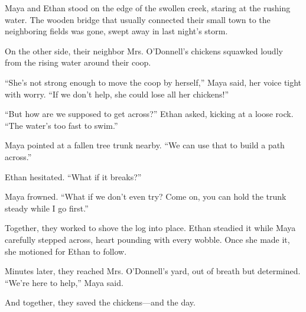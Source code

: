 \documentclass[12pt]{article}
\begin{document}
\begin{tcolorbox}[colframe=black!60, colback=white, 
coltitle=black, colbacktitle=black!15, fonttitle=\bfseries\Large, 
title=Text: The Flooded Creek, halign title=center, left=10pt, right=10pt, top=10pt, bottom=15pt]

Maya and Ethan stood on the edge of the swollen creek, staring at the rushing water. The wooden bridge that usually connected their small town to the neighboring fields was gone, swept away in last night’s storm. 

On the other side, their neighbor Mrs. O’Donnell’s chickens squawked loudly from the rising water around their coop.

“She’s not strong enough to move the coop by herself,” Maya said, her voice tight with worry. “If we don’t help, she could lose all her chickens!”

“But how are we supposed to get across?” Ethan asked, kicking at a loose rock. “The water’s too fast to swim.”

Maya pointed at a fallen tree trunk nearby. “We can use that to build a path across.”

Ethan hesitated. “What if it breaks?”

Maya frowned. “What if we don’t even try? Come on, you can hold the trunk steady while I go first.”

Together, they worked to shove the log into place. Ethan steadied it while Maya carefully stepped across, heart pounding with every wobble. Once she made it, she motioned for Ethan to follow.

Minutes later, they reached Mrs. O’Donnell’s yard, out of breath but determined. “We’re here to help,” Maya said.

And together, they saved the chickens—and the day.

\end{tcolorbox}
\end{document}
